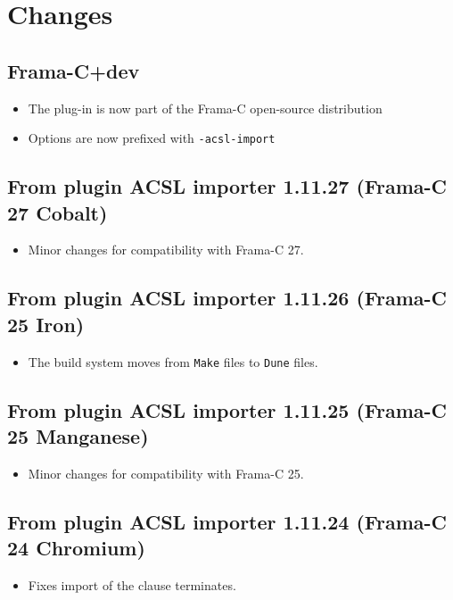 \chapter*{Changes}

\section*{Frama-C+dev}
\begin{itemize}
\item The plug-in is now part of the Frama-C open-source distribution
\item Options are now prefixed with \verb|-acsl-import|
\end{itemize}

\section*{From plugin ACSL importer 1.11.27 (Frama-C 27 Cobalt)}
\begin{itemize}
\item Minor changes for compatibility with Frama-C 27.
\end{itemize}

\section*{From plugin ACSL importer 1.11.26 (Frama-C 25 Iron)}
\begin{itemize}
\item The build system moves from \verb|Make| files to \verb|Dune| files.
\end{itemize}

\section*{From plugin ACSL importer 1.11.25 (Frama-C 25 Manganese)}
\begin{itemize}
\item Minor changes for compatibility with Frama-C 25.
\end{itemize}

\section*{From plugin ACSL importer 1.11.24 (Frama-C 24 Chromium)}
\begin{itemize}
\item Fixes import of the clause terminates.
\end{itemize}

